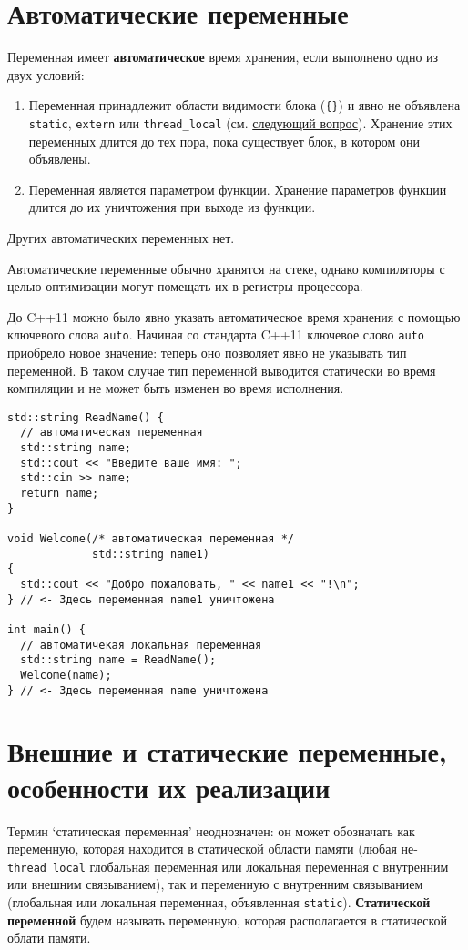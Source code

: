 \section{Автоматические переменные}
Переменная имеет \textbf{автоматическое} время хранения, если выполнено одно из двух условий:
\label{def:auto_storage}
\begin{enumerate}
  \item Переменная принадлежит области видимости блока (\verb|{}|) и явно не объявлена \verb|static|, \verb|extern| или \verb|thread_local|
  (см. \hyperref[sec:ext_stat]{следующий вопрос}).
  Хранение этих переменных длится до тех пора, пока существует блок, в котором они объявлены.
  \item Переменная является параметром функции. Хранение параметров функции длится до их уничтожения при выходе из функции.
\end{enumerate}
Других автоматических переменных нет.

Автоматические переменные обычно хранятся на стеке, однако компиляторы с целью
оптимизации могут помещать их в регистры процессора.

До C++11 можно было явно указать автоматическое время хранения с помощью
ключевого слова \verb|auto|. Начиная со стандарта C++11 ключевое слово
\verb|auto| приобрело новое значение: теперь оно позволяет явно не указывать
тип переменной. В таком случае тип переменной выводится статически во время
компиляции и не может быть изменен во время исполнения.

\begin{verbatim}
std::string ReadName() {
  // автоматическая переменная
  std::string name;
  std::cout << "Введите ваше имя: ";
  std::cin >> name;
  return name;
}

void Welcome(/* автоматическая переменная */
             std::string name1)
{
  std::cout << "Добро пожаловать, " << name1 << "!\n";
} // <- Здесь переменная name1 уничтожена

int main() {
  // автоматичекая локальная переменная
  std::string name = ReadName();
  Welcome(name);
} // <- Здесь переменная name уничтожена
\end{verbatim}

\section{Внешние и статические переменные, особенности их реализации}
\label{sec:ext_stat}
Термин `статическая переменная' неоднозначен: он может обозначать как переменную,
которая находится в статической области памяти (любая не-\verb|thread_local| глобальная
переменная или локальная переменная с внутренним или внешним связыванием),
так и переменную с внутренним связыванием (глобальная или локальная переменная, объявленная
\verb|static|). \textbf{Статической переменной} будем называть переменную, которая располагается
в статической облати памяти.


